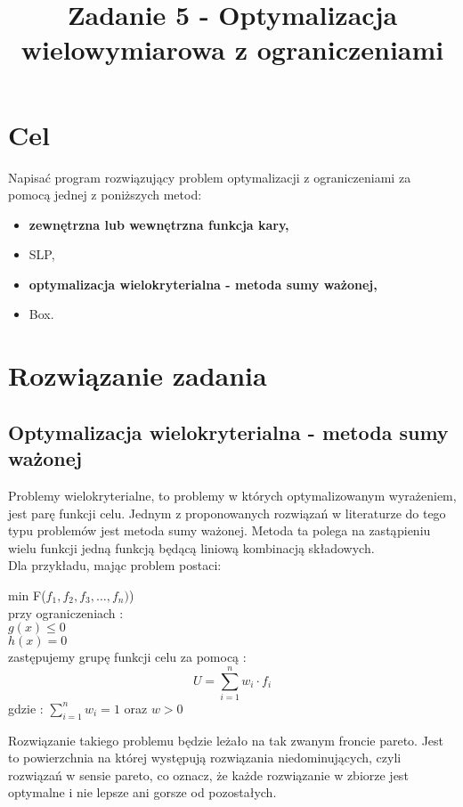 \documentclass{classrep}
\author{
  \studentinfo{Paweł Musiał}{178726} \and
  \studentinfo{Łukasz Michalski}{178724}
}
\title{Zadanie 5 - Optymalizacja wielowymiarowa z ograniczeniami} %
\begin{document}
\maketitle

\section{Cel}

Napisać program rozwiązujący problem optymalizacji z ograniczeniami za pomocą jednej z poniższych metod:
\begin{itemize}
\item    \textbf{zewnętrzna lub wewnętrzna funkcja kary,}
\item    SLP,
\item    \textbf{optymalizacja wielokryterialna - metoda sumy ważonej,}
\item    Box.
\end{itemize}


\section{Rozwiązanie zadania}

\subsection{Optymalizacja wielokryterialna - metoda sumy ważonej}

Problemy wielokryterialne, to problemy w których optymalizowanym wyrażeniem, jest parę funkcji celu. Jednym z proponowanych rozwiązań w literaturze \cite{2} do tego typu problemów jest metoda sumy ważonej. Metoda ta polega na zastąpieniu wielu funkcji jedną funkcją będącą liniową kombinacją składowych.\\

Dla przykładu, mając problem postaci:

min F($f_1, f_2, f_3, \dots, f_n)$)\\
przy ograniczeniach :\\
$g(x) \leq 0$\\
$h(x) = 0$\\

zastępujemy grupę funkcji celu za pomocą :\\
\begin{equation}
U = \sum \limits ^{n} _{i=1} w_i \cdot f_i
\end{equation}
gdzie : $\sum \limits ^{n} _{i=1} w_i = 1$
oraz $w>0$

Rozwiązanie takiego problemu będzie leżało na tak zwanym froncie pareto. Jest to powierzchnia na której występują rozwiązania niedominujących, czyli rozwiązań w sensie pareto, co oznacz, że każde rozwiązanie w zbiorze jest optymalne i nie lepsze ani gorsze od pozostałych. \\
 
\end{document}

